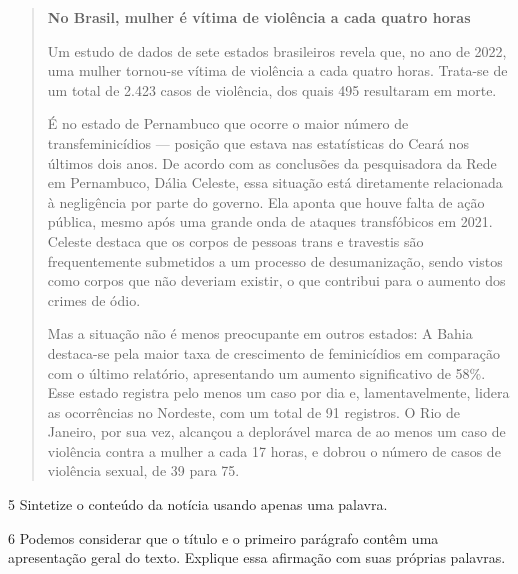 \begin{quote}

\textbf{No Brasil, mulher é vítima de violência a cada quatro horas}

Um estudo de dados de sete estados brasileiros revela que, no ano de
2022, uma mulher tornou-se vítima de violência a cada quatro horas. Trata-se de 
um total de 2.423 casos de violência, dos quais 495 resultaram em morte.

É no estado de Pernambuco que ocorre o maior número de transfeminicídios ---
posição que estava nas estatísticas do Ceará nos últimos dois anos. De acordo 
com as conclusões da pesquisadora da Rede em Pernambuco, Dália Celeste, essa 
situação está diretamente relacionada à negligência por parte do governo. Ela 
aponta que houve falta de ação pública, mesmo
após uma grande onda de ataques transfóbicos em 2021. Celeste
destaca que os corpos de pessoas trans e travestis são frequentemente
submetidos a um processo de desumanização, sendo vistos como corpos que não
deveriam existir, o que contribui para o aumento dos crimes de ódio.

Mas a situação não é menos preocupante em outros estados: A Bahia destaca-se 
pela maior taxa de crescimento de feminicídios em comparação com o último relatório, 
apresentando um aumento significativo de 58\%. Esse estado registra pelo 
menos um caso por dia e, lamentavelmente, lidera as ocorrências no Nordeste, 
com um total de 91 registros. O Rio de Janeiro, por sua vez, alcançou a deplorável marca de
ao menos um caso de violência contra a mulher a cada 17 horas, e dobrou 
o número de casos de violência sexual, de 39 para 75.

\end{quote}


\num{5} Sintetize o conteúdo da notícia usando apenas uma palavra. 


\num{6} Podemos considerar que o título e o primeiro parágrafo contêm uma apresentação 
geral do texto. Explique essa afirmação com suas próprias palavras.

